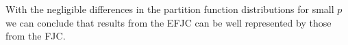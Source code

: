 With the negligible differences in the partition function distributions for small $p$ we can conclude that results from the EFJC can be well represented by those from the FJC.


 

